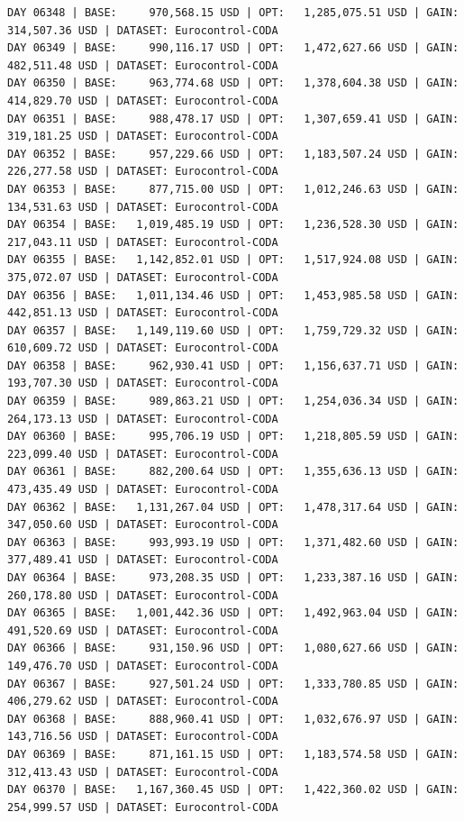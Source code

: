 \documentclass[11pt,a4paper]{article}
\begin{document}
\begin{verbatim}
DAY 06348 | BASE:     970,568.15 USD | OPT:   1,285,075.51 USD | GAIN: 314,507.36 USD | DATASET: Eurocontrol-CODA
DAY 06349 | BASE:     990,116.17 USD | OPT:   1,472,627.66 USD | GAIN: 482,511.48 USD | DATASET: Eurocontrol-CODA
DAY 06350 | BASE:     963,774.68 USD | OPT:   1,378,604.38 USD | GAIN: 414,829.70 USD | DATASET: Eurocontrol-CODA
DAY 06351 | BASE:     988,478.17 USD | OPT:   1,307,659.41 USD | GAIN: 319,181.25 USD | DATASET: Eurocontrol-CODA
DAY 06352 | BASE:     957,229.66 USD | OPT:   1,183,507.24 USD | GAIN: 226,277.58 USD | DATASET: Eurocontrol-CODA
DAY 06353 | BASE:     877,715.00 USD | OPT:   1,012,246.63 USD | GAIN: 134,531.63 USD | DATASET: Eurocontrol-CODA
DAY 06354 | BASE:   1,019,485.19 USD | OPT:   1,236,528.30 USD | GAIN: 217,043.11 USD | DATASET: Eurocontrol-CODA
DAY 06355 | BASE:   1,142,852.01 USD | OPT:   1,517,924.08 USD | GAIN: 375,072.07 USD | DATASET: Eurocontrol-CODA
DAY 06356 | BASE:   1,011,134.46 USD | OPT:   1,453,985.58 USD | GAIN: 442,851.13 USD | DATASET: Eurocontrol-CODA
DAY 06357 | BASE:   1,149,119.60 USD | OPT:   1,759,729.32 USD | GAIN: 610,609.72 USD | DATASET: Eurocontrol-CODA
DAY 06358 | BASE:     962,930.41 USD | OPT:   1,156,637.71 USD | GAIN: 193,707.30 USD | DATASET: Eurocontrol-CODA
DAY 06359 | BASE:     989,863.21 USD | OPT:   1,254,036.34 USD | GAIN: 264,173.13 USD | DATASET: Eurocontrol-CODA
DAY 06360 | BASE:     995,706.19 USD | OPT:   1,218,805.59 USD | GAIN: 223,099.40 USD | DATASET: Eurocontrol-CODA
DAY 06361 | BASE:     882,200.64 USD | OPT:   1,355,636.13 USD | GAIN: 473,435.49 USD | DATASET: Eurocontrol-CODA
DAY 06362 | BASE:   1,131,267.04 USD | OPT:   1,478,317.64 USD | GAIN: 347,050.60 USD | DATASET: Eurocontrol-CODA
DAY 06363 | BASE:     993,993.19 USD | OPT:   1,371,482.60 USD | GAIN: 377,489.41 USD | DATASET: Eurocontrol-CODA
DAY 06364 | BASE:     973,208.35 USD | OPT:   1,233,387.16 USD | GAIN: 260,178.80 USD | DATASET: Eurocontrol-CODA
DAY 06365 | BASE:   1,001,442.36 USD | OPT:   1,492,963.04 USD | GAIN: 491,520.69 USD | DATASET: Eurocontrol-CODA
DAY 06366 | BASE:     931,150.96 USD | OPT:   1,080,627.66 USD | GAIN: 149,476.70 USD | DATASET: Eurocontrol-CODA
DAY 06367 | BASE:     927,501.24 USD | OPT:   1,333,780.85 USD | GAIN: 406,279.62 USD | DATASET: Eurocontrol-CODA
DAY 06368 | BASE:     888,960.41 USD | OPT:   1,032,676.97 USD | GAIN: 143,716.56 USD | DATASET: Eurocontrol-CODA
DAY 06369 | BASE:     871,161.15 USD | OPT:   1,183,574.58 USD | GAIN: 312,413.43 USD | DATASET: Eurocontrol-CODA
DAY 06370 | BASE:   1,167,360.45 USD | OPT:   1,422,360.02 USD | GAIN: 254,999.57 USD | DATASET: Eurocontrol-CODA

\end{verbatim}
\end{document}
